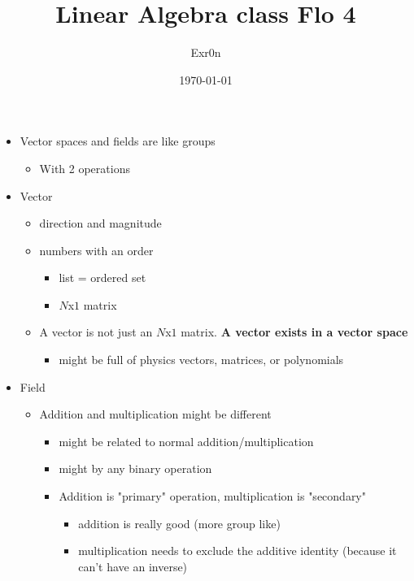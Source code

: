 \documentclass[letterpaper]{article}
\author{Exr0n}
\date{\today}
\title{Linear Algebra class Flo 4}
\renewcommand\maketitle{}
\begin{document}
\maketitle
\begin{itemize}
\item Vector spaces and fields are like groups

\begin{itemize}
\item With 2 operations
\end{itemize}

\item Vector

\begin{itemize}
\item direction and magnitude
\item numbers with an order

\begin{itemize}
\item list = ordered set
\item \(N\)x\(1\) matrix
\end{itemize}

\item A vector is not just an \(N\)x\(1\) matrix. \textbf{A vector exists in a
vector space}

\begin{itemize}
\item might be full of physics vectors, matrices, or polynomials
\end{itemize}
\end{itemize}

\item Field

\begin{itemize}
\item Addition and multiplication might be different

\begin{itemize}
\item might be related to normal addition/multiplication
\item might by any binary operation
\item Addition is "primary" operation, multiplication is "secondary"

\begin{itemize}
\item addition is really good (more group like)
\item multiplication needs to exclude the additive identity (because
it can't have an inverse)
\end{itemize}


\end{itemize}
\end{itemize}
\end{itemize}
\end{document}
